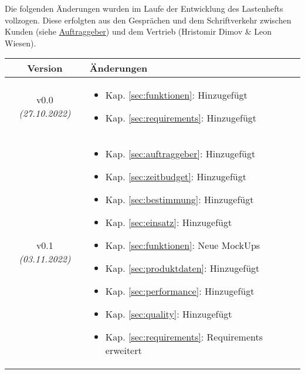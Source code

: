Die folgenden Änderungen wurden im Laufe der Entwicklung des Lastenhefts vollzogen. Diese erfolgten aus den Gesprächen und dem Schriftverkehr zwischen Kunden (siehe \hyperref[sec:auftraggeber]{Auftraggeber}) und dem Vertrieb (Hristomir Dimov \& Leon Wiesen).

\begin{xltabular}{\textwidth}{|c|X|}
    \hline
    \textbf{Version}   & \textbf{Änderungen}     \\
    \hline

    v0.0  \textit{(27.10.2022)} &  \begin{itemize}
        \item Kap. \ref{sec:funktionen}: Hinzugefügt
        \item Kap. \ref{sec:requirements}: Hinzugefügt
    \end{itemize}
    \\ \hline

    v0.1  \textit{(03.11.2022)} &  \begin{itemize}
        \item Kap. \ref{sec:auftraggeber}: Hinzugefügt
        \item Kap. \ref{sec:zeitbudget}: Hinzugefügt
        \item Kap. \ref{sec:bestimmung}: Hinzugefügt
        \item Kap. \ref{sec:einsatz}: Hinzugefügt
        \item Kap. \ref{sec:funktionen}: Neue MockUps
        \item Kap. \ref{sec:produktdaten}: Hinzugefügt
        \item Kap. \ref{sec:performance}: Hinzugefügt
        \item Kap. \ref{sec:quality}: Hinzugefügt
        \item Kap. \ref{sec:requirements}: Requirements erweitert
    \end{itemize}
    \\ \hline


\end{xltabular}
